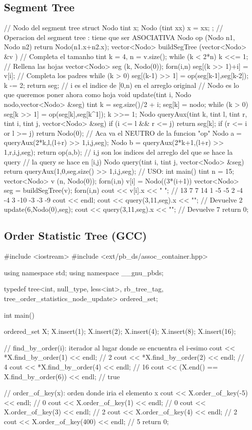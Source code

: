 \subsection{Segment Tree}
\begin{code}
// Nodo del segment tree
struct Nodo {
	tint x;
	Nodo (tint xx) { x = xx; }
};
// Operacion del segment tree : tiene que ser ASOCIATIVA
Nodo op (Nodo n1, Nodo n2) {
	return Nodo(n1.x+n2.x);
}
vector<Nodo> buildSegTree (vector<Nodo> &v ) {
	// Completa el tamanho
	tint k = 4, n = v.size();
	while (k < 2*n)
		k <<= 1;
	// Rellena las hojas
	vector<Nodo> seg (k, Nodo(0));
	forn(i,n)
		seg[(k >> 1)+i] = v[i];
	// Completa los padres
	while (k > 0) {
		seg[(k-1) >> 1] = op(seg[k-1],seg[k-2]);
		k -= 2;
	}	
	return seg; 
}
// i es el indice de [0,n) en el arreglo original
// Nodo es lo que queremos poner ahora como hoja
void update(tint i, Nodo nodo,vector<Nodo> &seg) {
	tint k = seg.size()/2 + i;
	seg[k] = nodo;
	while (k > 0) {
		seg[k >> 1] = op(seg[k],seg[k^1]);
		k >>= 1;
	}
}
Nodo queryAux(tint k, tint l, tint r, tint i, tint j, vector<Nodo> &seg) {	
	if (i <= l && r <= j)
		return seg[k];
	if (r <= i or l >= j)
		return Nodo(0); // Aca va el NEUTRO de la funcion "op"
	Nodo a = queryAux(2*k,l,(l+r) >> 1,i,j,seg);
	Nodo b = queryAux(2*k+1,(l+r) >> 1,r,i,j,seg);
	return op(a,b);	
}
// i,j son los indices del arreglo del que se hace la query
// la query se hace en [i,j)
Nodo query(tint i, tint j, vector<Nodo> &seg) {
	return queryAux(1,0,seg.size() >> 1,i,j,seg);
}
// USO:
int main() {
	tint n = 15;
	vector<Nodo> v (n, Nodo(0));
	forn(i,n)
		v[i] = Nodo((3*(i+1))%
	vector<Nodo> seg = buildSegTree(v);
	forn(i,n)
		cout << v[i].x << " "; // 13 7 7 14 1 -5 -5 2 -4 -4 3 -10 -3 -3 -9 
	cout << endl;
	cout << query(3,11,seg).x << "\n"; // Devuelve 2
	update(6,Nodo(0),seg);
	cout << query(3,11,seg).x << "\n"; // Devuelve 7
	return 0;
}
\end{code}

\subsection{Order Statistic Tree (GCC)}
\begin{code}
#include <iostream>
#include <ext/pb_ds/assoc_container.hpp>

using namespace std;
using namespace __gnu_pbds;

typedef tree<int, null_type, less<int>, rb_tree_tag, 
tree_order_statistics_node_update> ordered_set;

int main() {
  ordered_set X;
  X.insert(1); X.insert(2); X.insert(4); X.insert(8); X.insert(16);

  // find_by_order(i): iterador al lugar donde se encuentra el i-esimo
  cout << *X.find_by_order(1) << endl; // 2
  cout << *X.find_by_order(2) << endl; // 4
  cout << *X.find_by_order(4) << endl; // 16
  cout << (X.end() == X.find_by_order(6)) << endl; // true

  // order_of_key(x): orden donde iria el elemento x
  cout << X.order_of_key(-5) << endl;  // 0
  cout << X.order_of_key(1) << endl;   // 0
  cout << X.order_of_key(3) << endl;   // 2
  cout << X.order_of_key(4) << endl;   // 2
  cout << X.order_of_key(400) << endl; // 5
  return 0;
}
\end{code}
